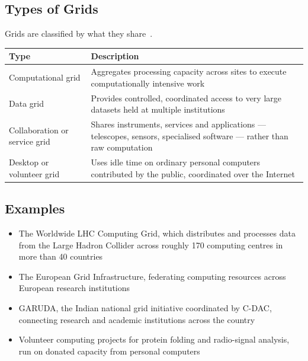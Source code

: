 \documentclass[../main.tex]{subfiles}
\begin{document}
\subsection{Types of Grids}

Grids are classified by what they share~.

\begin{center}
\begin{tabularx}{\textwidth}{@{}p{4.2cm}L@{}}
\toprule
\textbf{Type} & \textbf{Description} \\
\midrule
Computational grid & Aggregates processing capacity across sites to execute
  computationally intensive work \\
Data grid & Provides controlled, coordinated access to very large datasets
  held at multiple institutions \\
Collaboration or service grid & Shares instruments, services and
  applications --- telescopes, sensors, specialised software --- rather than
  raw computation \\
Desktop or volunteer grid & Uses idle time on ordinary personal computers
  contributed by the public, coordinated over the Internet \\
\bottomrule
\end{tabularx}
\end{center}

\subsection{Examples}

\begin{itemize}
  \item The Worldwide LHC Computing Grid, which distributes and processes
        data from the Large Hadron Collider across roughly 170 computing
        centres in more than 40 countries~
  \item The European Grid Infrastructure, federating computing resources
        across European research institutions~
  \item GARUDA, the Indian national grid initiative coordinated by C-DAC,
        connecting research and academic institutions across the
        country~
  \item Volunteer computing projects for protein folding and radio-signal
        analysis, run on donated capacity from personal computers
\end{itemize}
\end{document}
